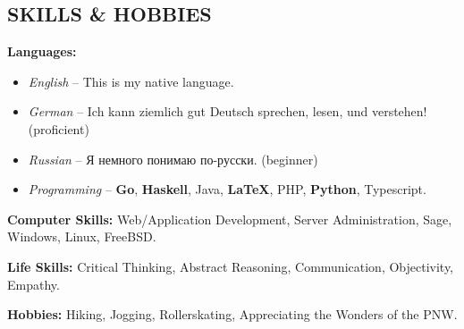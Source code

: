 \documentclass[margin]{res} %
\begin{document}
\begin{resume}

\section{SKILLS \& HOBBIES} 

{\bf Languages:}
\begin{itemize} \itemsep -2pt
	\item {\sl English} -- This is my native language.
	\item {\sl German} -- Ich kann ziemlich gut Deutsch sprechen, lesen, und verstehen! (proficient)
	\item {\sl Russian} -- \foreignlanguage{russian}{Я немного понимаю по-русски.} (beginner)
	\item {\sl Programming} -- {\bf Go}, {\bf Haskell}, Java, {\bf \LaTeX}, PHP, {\bf Python}, Typescript.
\end{itemize}
{\bf Computer Skills:} Web/Application Development, Server Administration, Sage, Windows, Linux, FreeBSD.

{\bf Life Skills:} Critical Thinking, Abstract Reasoning, Communication, Objectivity, Empathy.

{\bf Hobbies:} Hiking, Jogging, Rollerskating, Appreciating the Wonders of the PNW.



\end{resume}
\end{document}
